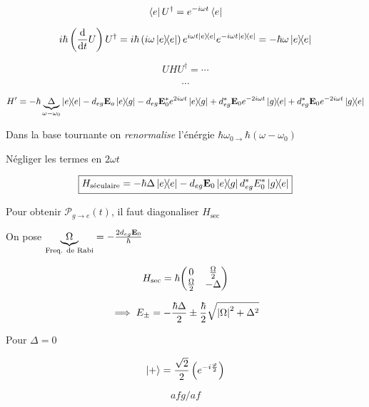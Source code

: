 $$\bra{e} U^{\dagger}= e^{-i\omega t} \bra{e}$$ 


$$i\hbar \left( \dv{{}}{t} U \right) U^{\dagger}= i\hbar \left( i\omega \op e  \right) e^{i\omega t \op e} e^{-i\omega t \op e} = -\hbar \omega \op e$$ 

$$UHU^{\dagger} = \dotsb$$ 


$$\dotsb$$ 


$$H' = -\hbar \underbrace{\Delta}_{\omega-\omega_0 }  \op e - d_{eg} \vb{E}_o \op {e}{g} - d_{eg} \vb{E}_0^* e^{2i\omega t} \op{e}{g} + d_{eg}^{*}\vb{E}_0 e^{-2i\omega t} \op{g}{e} + d_{eg}^{*}\vb{E}_0 e^{-2i\omega t} \op{g}{e}$$ 

\begin{tcolorbox}[title=]
	\centering Dans la base tournante on \textit{renormalise} l'énérgie $\hbar \omega_{0\to} \hbar(\omega-\omega_0)$ 
\end{tcolorbox}

\begin{tcolorbox}[title=Approximation Séculaire (Rotating wave approximation | RWA)]
	 \centering Négliger les termes en $2\omega t$ 
\end{tcolorbox}


$$\boxed{H_{\text{séculaire}} = -\hbar \Delta \op e - d_{eg} \vb{E}_0 \op{e}{g} d_{eg}^{*} E_0^{*} \op{g}{e} }$$ 

Pour obtenir $\mathcal{P}_{g\to e}(t)$, il faut diagonaliser $H_{\text{sec}} $  

On pose $\underbrace{\Omega}_{\text{Freq. de Rabi} }  = - \frac{2d_{eg}\vb{E}_0}{\hbar} $  

$$H_{\text{sec}} = \hbar \mqty(0 & \frac{\Omega}{2} \\ \frac{\Omega}{2} & -\Delta)$$ 

$$\implies E_{\pm} = - \frac{\hbar\Delta}{2} \pm \frac{\hbar}{2} \sqrt{\abs{\Omega}^{2}+\Delta^2}$$ 


Pour $\Delta =0$  

$$\ket{+} = \frac{\sqrt{2}}{2 } \left( e^{-i \frac{\varphi}{2 } } \right) $$ 

$$a f g/af$$ 


